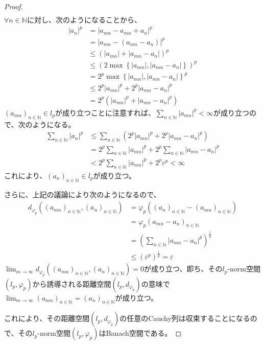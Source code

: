 \documentclass[dvipdfmx]{jsarticle}
\begin{document}
\begin{proof}
\begin{align*}
\end{align*}
$\forall n \in \mathbb{N}$に対し、次のようになることから、
\begin{align*}
\left| a_{n} \right|^{p} &= \left| a_{mn} - a_{mn} + a_{n} \right|^{p}\\
&= \left| a_{mn} - \left( a_{mn} - a_{n} \right) \right|^{p}\\
&\leq \left( \left| a_{mn} \right| + \left| a_{mn} - a_{n} \right| \right)^{p}\\
&\leq \left( 2\max\left\{ \left| a_{mn} \right|,\left| a_{mn} - a_{n} \right| \right\} \right)^{p}\\
&= 2^{p}{\max\left\{ \left| a_{mn} \right|,\left| a_{mn} - a_{n} \right| \right\}}^{p}\\
&\leq 2^{p}\left| a_{mn} \right|^{p} + 2^{p}\left| a_{mn} - a_{n} \right|^{p}\\
&= 2^{p}\left( \left| a_{mn} \right|^{p} + \left| a_{mn} - a_{n} \right|^{p} \right)
\end{align*}
$\left( a_{mn} \right)_{n \in \mathbb{N}} \in l_{p}$が成り立つことに注意すれば、$\sum_{n \in \mathbb{N}} \left| a_{mn} \right|^{p} < \infty$が成り立つので、次のようになる。
\begin{align*}
\sum_{n \in \mathbb{N}} \left| a_{n} \right|^{p} &\leq \sum_{n \in \mathbb{N}} \left( 2^{p}\left| a_{mn} \right|^{p} + 2^{p}\left| a_{mn} - a_{n} \right|^{p} \right)\\
&= 2^{p}\sum_{n \in \mathbb{N}} \left| a_{mn} \right|^{p} + 2^{p}\sum_{n \in \mathbb{N}} \left| a_{mn} - a_{n} \right|^{p}\\
&< 2^{p}\sum_{n \in \mathbb{N}} \left| a_{mn} \right|^{p} + 2^{p}\varepsilon^{p} < \infty
\end{align*}
これにより、$\left( a_{n} \right)_{n \in \mathbb{N}} \in l_{p}$が成り立つ。\par
さらに、上記の議論により次のようになるので、
\begin{align*}
d_{\varphi_{p}}\left( \left( a_{mn} \right)_{n \in \mathbb{N}},\left( a_{n} \right)_{n \in \mathbb{N}} \right) &= \varphi_{p}\left( \left( a_{n} \right)_{n \in \mathbb{N}} - \left( a_{mn} \right)_{n \in \mathbb{N}} \right)\\
&= \varphi_{p}\left( a_{mn} - a_{n} \right)_{n \in \mathbb{N}}\\
&= \left( \sum_{n \in \mathbb{N}} \left| a_{mn} - a_{n} \right|^{p} \right)^{\frac{1}{p}}\\
&\leq \left( \varepsilon^{p} \right)^{\frac{1}{p}} = \varepsilon
\end{align*}
$\lim_{m \rightarrow \infty}{d_{\varphi_{p}}\left( \left( a_{mn} \right)_{n \in \mathbb{N}},\left( a_{n} \right)_{n \in \mathbb{N}} \right)} = 0$が成り立つ、即ち、その$l_{p}$-norm空間$\left( l_{p},\varphi_{p} \right)$から誘導される距離空間$\left( l_{p},d_{\varphi_{p}} \right)$の意味で$\lim_{m \rightarrow \infty}\left( a_{mn} \right)_{n \in \mathbb{N}} = \left( a_{n} \right)_{n \in \mathbb{N}}$が成り立つ。\par
これにより、その距離空間$\left( l_{p},d_{\varphi_{p}} \right)$の任意のCauchy列は収束することになるので、その$l_{p}$-norm空間$\left( l_{p},\varphi_{p} \right)$はBanach空間である。
\end{proof}\par
\end{document}
